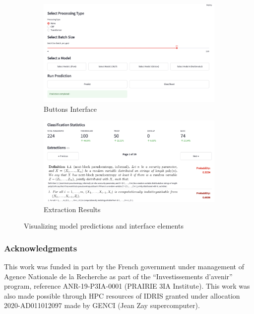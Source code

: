 \documentclass[runningheads]{llncs}
\begin{document}
\begin{figure}[h]
	\begin{subfigure}[b]{0.48\textwidth}
		\centering
		\includegraphics[width=\textwidth]{images/buttons.png}
		\caption{Buttons Interface}
		\label{fig:buttons}
	\end{subfigure}
	\hfill
	\begin{subfigure}[b]{0.48\textwidth}
		\centering
		\includegraphics[width=\textwidth]{images/extractions.png}
		\caption{Extraction Results}
		\label{fig:extractions}
	\end{subfigure}
	\caption{Visualizing model predictions and interface elements}
	\label{fig:predictions_and_interface}
\end{figure}

\subsubsection*{Acknowledgments}
This work was funded in part by the French government under
management of Agence Nationale de la Recherche as part of the
“Investissements d’avenir” program, reference ANR-19-P3IA-0001
(PRAIRIE 3IA Institute). This work was also made possible through
HPC resources of IDRIS granted under allocation 2020-AD011012097
made by GENCI (Jean Zay supercomputer).
\end{document}
